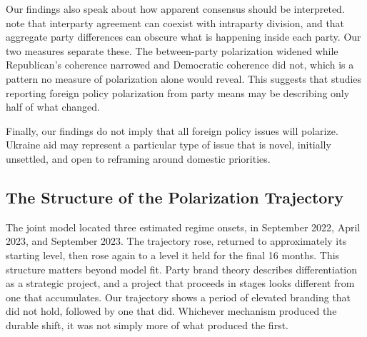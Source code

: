Our findings also speak about how apparent consensus should be interpreted. \citet{friedrichsPolarizationUSForeign2022} note that interparty agreement can coexist with intraparty division, and that aggregate party differences can obscure what is happening inside each party. Our two measures separate these. The between-party polarization widened while Republican's coherence narrowed and Democratic coherence did not, which is a pattern no measure of polarization alone would reveal. This suggests that studies reporting foreign policy polarization from party means may be describing only half of what changed.

Finally, our findings do not imply that all foreign policy issues will polarize. Ukraine aid may represent a particular type of issue that is novel, initially unsettled, and open to reframing around domestic priorities.

\subsection{The Structure of the Polarization Trajectory}

The joint model located three estimated regime onsets, in September 2022, April 2023, and September 2023. The trajectory rose, returned to approximately its starting level, then rose again to a level it held for the final 16 months. This structure matters beyond model fit. Party brand theory describes differentiation as a strategic project, and a project that proceeds in stages looks different from one that accumulates. Our trajectory shows a period of elevated branding that did not hold, followed by one that did. Whichever mechanism produced the durable shift, it was not simply more of what produced the first.

